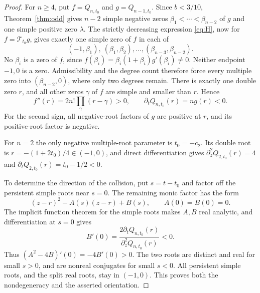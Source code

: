 \documentclass[11pt]{article}
\theoremstyle{remark}
\newcommand{\T}{\mathcal{T}}
\begin{document}
\begin{proof}
For $n\ge4$, put $f=Q_{n,t_0}$ and $g=Q_{n-1,t_0}$.
Since $b<3/10$, Theorem~\ref{thm:odd} gives $n-2$ simple negative zeros
$\beta_1<\cdots<\beta_{n-2}$ of $g$ and one simple positive zero
$\lambda$. The strictly decreasing expression \eqref{eq:H}, now for
$f=\T_{t_0}g$, gives exactly one simple zero of $f$ in each of
\[
 (-1,\beta_1),\ (\beta_1,\beta_2),\ldots,
 (\beta_{n-3},\beta_{n-2}).
\]
No $\beta_i$ is a zero of $f$, since
$f(\beta_i)=\beta_i(1+\beta_i)g'(\beta_i)\ne0$.
Neither endpoint $-1,0$ is a zero. Admissibility and the degree count
therefore force every multiple zero into $(\beta_{n-2},0)$, where only
two degrees remain. There is exactly one double zero $r$, and all other
zeros $\gamma$ of $f$ are simple and smaller than $r$. Hence
\[
 f''(r)=2n!\prod_{\gamma}(r-\gamma)>0,\qquad
 \partial_tQ_{n,t_0}(r)=ng(r)<0.
\]
For the second sign, all negative-root factors of $g$ are positive at
$r$, and its positive-root factor is negative.

For $n=2$ the only negative multiple-root parameter is $t_0=-c_2$.
Its double root is $r=-(1+2t_0)/4\in(-1,0)$, and direct differentiation
gives $\partial_z^2Q_{2,t_0}(r)=4$ and
$\partial_tQ_{2,t_0}(r)=t_0-1/2<0$.

To determine the direction of the collision, put $s=t-t_0$ and factor
off the persistent simple roots near $s=0$. The remaining monic factor
has the form
\[
 (z-r)^2+A(s)(z-r)+B(s),\qquad A(0)=B(0)=0.
\]
The implicit function theorem for the simple roots makes $A,B$ real
analytic, and differentiation at $s=0$ gives
\[
 B'(0)=\frac{2\partial_tQ_{n,t_0}(r)}{\partial_z^2Q_{n,t_0}(r)}<0.
\]
Thus $(A^2-4B)'(0)=-4B'(0)>0$. The two roots are distinct and real for
small $s>0$, and are nonreal conjugates for small $s<0$.
All persistent simple roots, and the split real roots, stay in $(-1,0)$.
This proves both the nondegeneracy and the asserted orientation.
\end{proof}
\end{document}
